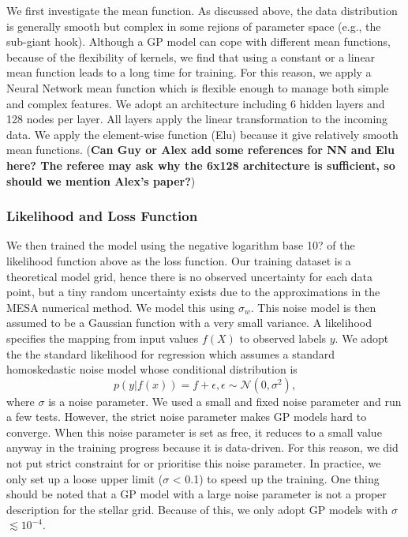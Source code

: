 We first investigate the mean function. As discussed above, the data distribution is generally smooth but complex in some rejions of parameter space (e.g., the sub-giant hook).  Although a GP model can cope with different mean functions,  because of the flexibility of kernels, we find that using a constant or a linear mean function leads to a long time for training. For this reason, we apply a Neural Network mean function which is flexible enough to manage both simple and complex features. We adopt an architecture including 6 hidden layers and 128 nodes per layer. All layers apply the linear transformation to the incoming data. We apply the element-wise function (Elu) because it give relatively smooth mean functions. ({\bf Can Guy or Alex add some references for NN and Elu here? The referee may ask why the 6x128 architecture is sufficient, so should we mention Alex's paper?})

\subsubsection{Likelihood and Loss Function}

We then trained the model using the negative logarithm {base 10?} of the likelihood function above as the loss function.  Our training dataset is a theoretical model grid,  hence there is no observed uncertainty for each data point, but a tiny random uncertainty exists due to the approximations in the \textsc{MESA} numerical method. We model this using $\sigma_{w}$.  This noise model is then assumed to be a Gaussian function with a very small variance.  
%   
A likelihood specifies the mapping from input values $f(X)$ to observed labels $y$.
We adopt the the standard likelihood for regression which assumes a standard homoskedastic noise model whose conditional distribution is
\begin{equation}\label{eq:likelihood}
p(y|f(x)) = f + \epsilon, \epsilon \sim \mathcal{N}(0, \sigma^{2}),
\end{equation}
where $\sigma$ is a noise parameter. 
%
We used a small and fixed noise parameter and run a few tests.  However, the strict noise parameter makes GP models hard to converge. When this noise parameter is set as free, it reduces to a small value anyway in the training progress because it is data-driven.  For this reason, we did not put strict constraint for or prioritise this noise parameter.  In practice, we only set up a loose upper limit ($\sigma$  < 0.1) to speed up the training. One thing should be noted that a GP model with a large noise parameter is not a proper description for the stellar grid. Because of this, we only adopt GP models with $\sigma$ $\lesssim 10^{-4}$.   


